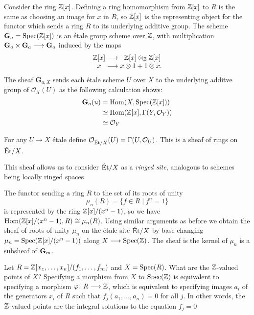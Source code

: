 \begin{example}
	Consider the ring $\mathbb{Z}[x]$. Defining a ring homomorphism from $\mathbb{Z}[x]$ to $R$ is the same as choosing an image for $x$ in $R$, so $\mathbb{Z}[x]$ is the representing object for the functor which sends a ring $R$ to its underlying additive group.
	The scheme $\mathbf{G}_a = \operatorname{Spec}(\mathbb{Z}[x])$ is an \'etale group scheme over $\mathbb{Z}$, with multiplication $\mathbf{G}_a \times \mathbf{G}_a \longrightarrow \mathbf{G}_a$ induced by the maps
	\[
		\begin{array}{c @{{}\to{}} c @{{}{}} c}
			\Z[x] & \centermathcell{\Z[x]\otimes_\Z \Z[x]}     \\
			x     & \centermathcell{x\otimes 1 + 1 \otimes x}.
		\end{array}
	\]
	The sheaf $\mathbf{G}_{a,X}$ sends each \'etale scheme $U$ over $X$ to the underlying additve group of $\mathcal{O}_X(U)$ as the following calculation shows:
	\begin{align*}
		\mathbf{G}_a(u) & = \operatorname{Hom}(X, \operatorname{Spec}(\mathbb{Z}[x]))                 \\
		       & \simeq \operatorname{Hom}(\mathbb{Z}[x], \Gamma(Y, \mathcal{O}_Y)) \\
		       & \simeq \mathcal{O}_Y
	\end{align*}
\end{example}

\begin{example}
	For any $U \to X$ \'etale define $\mathcal{O}_{\text{\'Et}/X}(U) = \Gamma(U, \mathcal{O}_U)$. This is a sheaf of rings on $\text{\'Et}/X$.
\end{example}

\begin{remark}
	This sheaf allows us to consider $\text{\'Et}/X$ as a \textit{ringed site}, analogous to schemes being locally ringed spaces.
\end{remark}

\begin{example}
	The functor sending a ring $R$ to the set of its roots of unity
	\[
		\mu_n(R) = \{f \in R \mid f^n = 1\}
	\]
	is represented by the ring $\mathbb{Z}[x]/(x^n-1)$, so we have $\operatorname{Hom}(\mathbb{Z}[x]/(x^n-1),R) \cong \mu_n(R)$. Using similar arguments as before we obtain the sheaf of roots of unity $\mu_n$ on the \'etale site $\text{\'Et}/X$ by base changing $\mu_n = \operatorname{Spec}(\mathbb{Z}[x]/(x^n-1))$ along $X \longrightarrow \operatorname{Spec}(\mathbb{Z})$. The sheaf is the kernel of $\mu_n$ is a subsheaf of $\mathbf{G}_m$.
\end{example}

\begin{example}
	Let $R=\mathbb{Z}[x_z, \dots, x_n]/(f_1, \dots , f_m)$ and $X = \operatorname{Spec}(R)$. What are the $\mathbb{Z}$-valued points of $X$? Specifying a morphism from $X$ to $\operatorname{Spec}(\mathbb{Z})$ is equivalent to specifying a morphism $\varphi\colon R \longrightarrow \mathbb{Z}$, which is equivalent to specifying images $a_i$ of the generators $x_i$ of $R$ such that $f_j(a_1, \dots, a_n) = 0$ for all $j$. In other words, the $\mathbb{Z}$-valued points are the integral solutions to the equation $f_j = 0$
\end{example}

